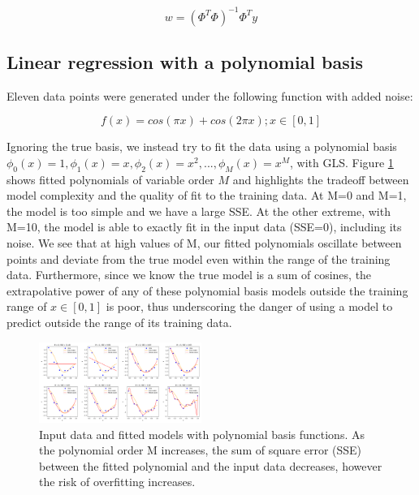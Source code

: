 \documentclass[10pt, twocolumn]{article}
\begin{document}
$$w = (\Phi^T\Phi)^{-1}\Phi^Ty$$

\subsection{Linear regression with a polynomial basis}

Eleven data points were generated under the following function with added noise:

$$f(x) = cos(\pi x) + cos(2\pi x); x \in [0,1]$$

Ignoring the true basis, we instead try to fit the data using a polynomial basis $\phi_0(x) = 1, \phi_1(x) = x, \phi_2(x) = x^2, ... , \phi_M(x) = x^M$, with GLS.  Figure \ref{fig:polyfit} shows fitted polynomials of variable order $M$ and highlights the tradeoff between model complexity and the quality of fit to the training data. At M=0 and M=1, the model is too simple and we have a large SSE. At the other extreme, with M=10, the model is able to exactly fit in the input data (SSE=0), including its noise. We see that at high values of M, our fitted polynomials oscillate between points and deviate from the true model even within the range of the training data. Furthermore, since we know the true model is a sum of cosines, the extrapolative power of any of these polynomial basis models outside the training range of $x \in [0,1]$ is poor, thus underscoring the danger of using a model to predict outside the range of its training data.

\begin{figure}
\caption{Input data and fitted models with polynomial basis functions. As the polynomial order M increases, the sum of square error (SSE) between the fitted polynomial and the input data decreases, however the risk of overfitting increases.}
\begin{center}
\includegraphics[width=200px]{all_regress_m}
\end{center}
\label{fig:polyfit}
\end{figure}
\end{document}
